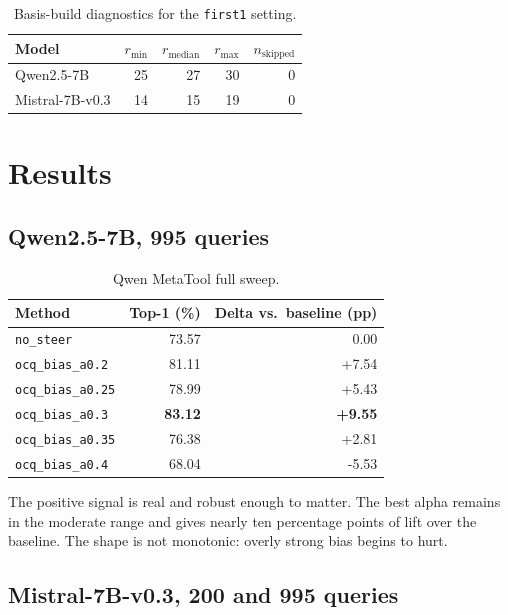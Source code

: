 \documentclass[11pt,a4paper]{article}
\begin{document}
\begin{table}[H]
\centering
\begin{tabular}{lrrrr}
\toprule
Model & $r_{\min}$ & $r_{\mathrm{median}}$ & $r_{\max}$ & $n_{\mathrm{skipped}}$ \\
\midrule
Qwen2.5-7B & 25 & 27 & 30 & 0 \\
Mistral-7B-v0.3 & 14 & 15 & 19 & 0 \\
\bottomrule
\end{tabular}
\caption{Basis-build diagnostics for the \texttt{first1} setting.}
\end{table}

\section{Results}

\subsection{Qwen2.5-7B, 995 queries}

\begin{table}[H]
\centering
\begin{tabular}{lrr}
\toprule
Method & Top-1 (\%) & Delta vs.\ baseline (pp) \\
\midrule
\texttt{no\_steer} & 73.57 & 0.00 \\
\texttt{ocq\_bias\_a0.2} & 81.11 & +7.54 \\
\texttt{ocq\_bias\_a0.25} & 78.99 & +5.43 \\
\texttt{ocq\_bias\_a0.3} & \textbf{83.12} & \textbf{+9.55} \\
\texttt{ocq\_bias\_a0.35} & 76.38 & +2.81 \\
\texttt{ocq\_bias\_a0.4} & 68.04 & -5.53 \\
\bottomrule
\end{tabular}
\caption{Qwen MetaTool full sweep.}
\end{table}

The positive signal is real and robust enough to matter. The best alpha remains
in the moderate range and gives nearly ten percentage points of lift over the
baseline. The shape is not monotonic: overly strong bias begins to hurt.

\subsection{Mistral-7B-v0.3, 200 and 995 queries}
\end{document}
